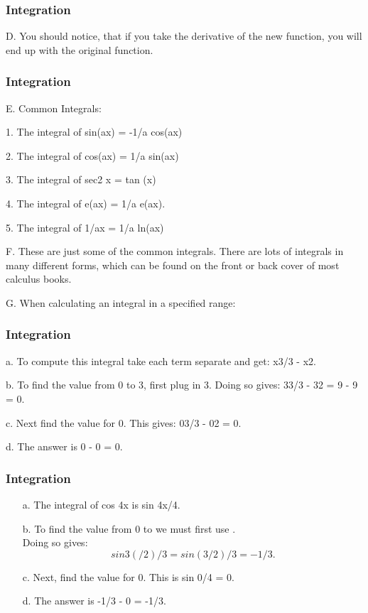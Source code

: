 \documentclass{beamer}
\begin{document}
\begin{frame}
	\frametitle{Integration}
	
	D.  You should notice, that if you take the derivative of the new function, you will end up with the original function.
	
\end{frame}
\begin{frame}
	\frametitle{Integration}
	
	E.  Common Integrals:
	
	1.  The integral of sin(ax) = -1/a cos(ax)
	
	2.  The integral of cos(ax) = 1/a sin(ax)
	
	3.  The integral of sec2 x = tan (x)
	
	4.  The integral of e(ax) = 1/a e(ax).
	
	5.  The integral of 1/ax = 1/a ln(ax)
	
	F.  These are just some of the common integrals.  There are lots of integrals in many different forms, which can be found on the front or back cover of most calculus books.
	
	G.  When calculating an integral in a specified range:
	
\end{frame}
\begin{frame}
	\frametitle{Integration}
	
	
	
	a.  To compute this integral take each term separate and get: x3/3 - x2.
	
	b.  To find the value from 0 to 3, first plug in 3.  Doing so gives:  33/3 - 32 = 9 - 9 = 0.
	
	c.  Next find the value for 0.  This gives: 03/3 - 02 = 0.
	
	d.  The answer is 0 - 0 = 0.
	
	
\end{frame}
\begin{frame}
	\frametitle{Integration}
\Large
\begin{itemize}
\item[a.]  The integral of cos 4x is sin 4x/4.
	
\item[b.]  To find the value from 0 to  we must first use . \\  Doing so gives: \[ sin 3(/2)/3 = sin(3/2)/3 = -1/3. \]
	
\item[c.]  Next, find the value for 0.  This is sin 0/4 = 0.
	
\item[d.]  The answer is -1/3 - 0 = -1/3.
\end{itemize}
\end{frame}
\end{document}
